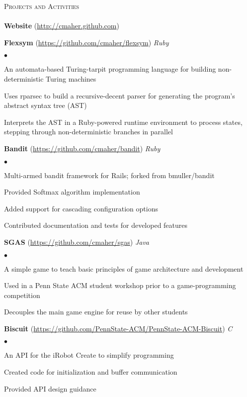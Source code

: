 \documentclass{article}
\newcommand{\lineunder}{\vspace*{-8pt} \\ \hspace*{-18pt} \hrulefill \\}
\newcommand{\header}[1]{{\hspace*{-15pt}\vspace*{6pt} \textsc{#1}} \vspace*{-6pt} \lineunder}
\newcommand{\project}[3]{{ \textbf{#1} (\url{#2}) \hfill \textit{#3} \\ }}
\newenvironment{achievements}{\begin{list}{$\bullet$}{\topsep 0pt \itemsep -2pt}}{\vspace*{4pt}\end{list}}
\begin{document}
\header{Projects and Activities}

\project{Website}{http://cmaher.github.com}{}
\vspace{2pt}

\project{Flexsym}{https://github.com/cmaher/flexsym}{Ruby}
    \begin{achievements}
    \item An automata-based Turing-tarpit programming language for building non-deterministic Turing machines
    \item Uses rparsec to build a recursive-decent parser for generating the program's abstract syntax tree (AST)
    \item Interprets the AST in a Ruby-powered runtime environment to process states, stepping through non-deterministic branches in parallel
    \end{achievements}


\project{Bandit}{https://github.com/cmaher/bandit}{Ruby}
    \begin{achievements}
    \item Multi-armed bandit framework for Rails; forked from bmuller/bandit
    \item Provided Softmax algorithm implementation
    \item Added support for cascading configuration options
    \item Contributed documentation and tests for developed features
    \end{achievements}

    
\project{SGAS}{https://github.com/cmaher/sgas}{Java}
    \begin{achievements}
    \item A simple game to teach basic principles of game architecture and development
    \item Used in a Penn State ACM student workshop prior to a game-programming competition
    \item Decouples the main game engine for reuse by other students
    \end{achievements}


\project{Biscuit}{https://github.com/PennState-ACM/PennState-ACM-Biscuit}{C}
    \begin{achievements}
    \item An API for the iRobot Create to simplify programming
    \item Created code for initialization and buffer communication
    \item Provided API design guidance
    \end{achievements}
\end{document}
